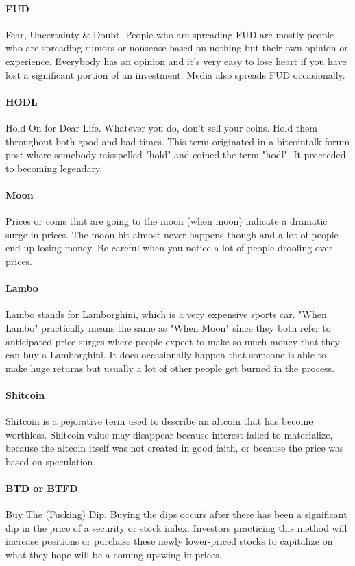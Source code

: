 \paragraph{FUD}
Fear, Uncertainty & Doubt. People who are spreading FUD are mostly people who are spreading rumors or nonsense based on nothing but their own opinion or experience. Everybody has an opinion and it's very easy to lose heart if you have lost a significant portion of an investment. Media also spreads FUD occasionally.

\paragraph{HODL}
Hold On for Dear Life. Whatever you do, don't sell your coins. Hold them throughout both good and bad times. This term originated in a bitcointalk forum post where somebody misspelled "hold" and coined the term "hodl". It proceeded to becoming legendary.

\paragraph{Moon}
Prices or coins that are going to the moon (when moon) indicate a dramatic surge in prices. The moon bit almost never happens though and a lot of people end up losing money. Be careful when you notice a lot of people drooling over prices.

\paragraph{Lambo}
Lambo stands for Lamborghini, which is a very expensive sports car. "When Lambo" practically means the same as "When Moon" since they both refer to anticipated price surges where people expect to make so much money that they can buy a Lamborghini. It does occasionally happen that someone is able to make huge returns but usually a lot of other people get burned in the process.

\paragraph{Shitcoin}
Shitcoin is a pejorative term used to describe an altcoin that has become worthless. Shitcoin value may disappear because interest failed to materialize, because the altcoin itself was not created in good faith, or because the price was based on speculation.  

\paragraph{BTD or BTFD} 
Buy The (Fucking) Dip. Buying the dips occurs after there has been a significant dip in the price of a security or stock index. Investors practicing this method will increase positions or purchase these newly lower-priced stocks to capitalize on what they hope will be a coming upswing in prices.  

